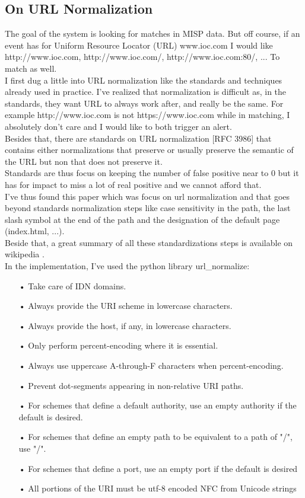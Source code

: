 \documentclass{eplmastersthesis}
\begin{document}
\subsection{On URL Normalization}
The goal of the system is looking for matches in MISP data. But off course, if an event has for Uniform Resource Locator (URL) www.ioc.com I would like http://www.ioc.com, http://www.ioc.com/, http://www.ioc.com:80/, ... To match as well.\\
I first dug a little into URL normalization like the standards and techniques already used in practice. I've realized that normalization is difficult as, in the standards, they want URL to always work after, and really be the same. For example http://www.ioc.com is not https://www.ioc.com while in matching, I absolutely don't care and I would like to both trigger an alert.\\
Besides that, there are standards on URL normalization [RFC 3986] that contains either normalizations that preserve or usually preserve the semantic of the URL but non that does not preserve it.\\
Standards are thus focus on keeping the number of false positive near to 0 but it has for impact to miss a lot of real positive and we cannot afford that.\\
I've thus found this paper \cite{lee2005url} which was focus on url normalization and that goes beyond standards normalization steps like case sensitivity in the path, the last slash symbol at the end of the path and the designation of the default page (index.html, ...).\\
Beside that, a great summary of all these standardizations steps is available on wikipedia \cite{wikiNormalizationURL}.\\
In the implementation, I've used the python library url\_normalize:
\begin{itemize}
\item[•] Take care of IDN domains.
\item[•] Always provide the URI scheme in lowercase characters.
\item[•] Always provide the host, if any, in lowercase characters.
\item[•] Only perform percent-encoding where it is essential.
\item[•] Always use uppercase A-through-F characters when percent-encoding.
\item[•] Prevent dot-segments appearing in non-relative URI paths.
\item[•] For schemes that define a default authority, use an empty authority if the default is desired.
\item[•] For schemes that define an empty path to be equivalent to a path of "/", use "/".
\item[•] For schemes that define a port, use an empty port if the default is desired
\item[•] All portions of the URI must be utf-8 encoded NFC from Unicode strings
\end{itemize}
\end{document}
